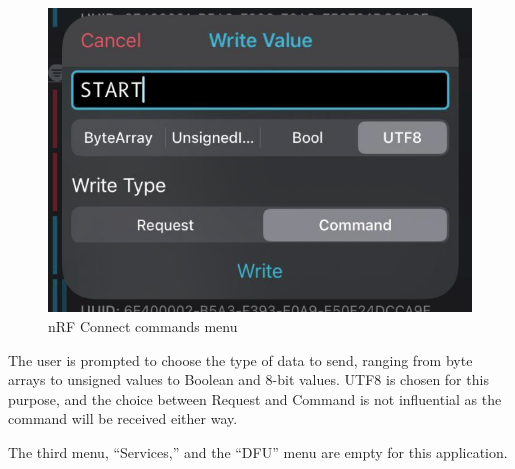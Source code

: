 \documentclass{Configuration_Files/PoliMi3i_thesis}
\begin{document}
\begin{figure}[H]
    \centering
    \includegraphics[scale=0.6]{Multicentral/14.png}
    \caption{nRF Connect commands menu}
    \label{multicentral_14}
\end{figure}

The user is prompted to choose the type of data to send, ranging from byte arrays to unsigned values to Boolean and 8-bit values. UTF8 is chosen for this purpose, and the choice between Request and Command is not influential as the command will be received either way.

The third menu, “Services,” and the “DFU” menu are empty for this application.
\end{document}
